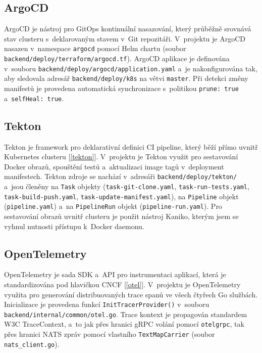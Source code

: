 \documentclass[11pt, a4paper, oneside]{article}
\begin{document}
\subsection{ArgoCD}

ArgoCD je nástroj pro GitOps kontinuální nasazování, který průběžně srovnává stav clusteru s~deklarovaným stavem v~Git repozitáři. V~projektu je ArgoCD nasazen v~namespace \texttt{argocd} pomocí Helm chartu (soubor \texttt{backend/deploy/terraform/argocd.tf}). ArgoCD aplikace je definována v~souboru \texttt{backend/deploy/argocd/application.yaml} a~je nakonfigurována tak, aby sledovala adresář \texttt{backend/deploy/k8s} na větvi \texttt{master}. Při detekci změny manifestů je provedena automatická synchronizace s~politikou \texttt{prune: true} a~\texttt{selfHeal: true}.

\subsection{Tekton}

Tekton je framework pro deklarativní definici CI pipeline, který běží přímo uvnitř Kubernetes clusteru [\ref{tekton}]. V~projektu je Tekton využit pro sestavování Docker obrazů, spouštění testů a~aktualizaci image tagů v~deployment manifestech. Tekton zdroje se nachází v~adresáři \texttt{backend/deploy/tekton/} a~jsou členěny na \texttt{Task} objekty (\texttt{task-git-clone.yaml}, \texttt{task-run-tests.yaml}, \texttt{task-build-push.yaml}, \texttt{task-update-manifest.yaml}), na \texttt{Pipeline} objekt (\texttt{pipeline.yaml}) a~na \texttt{PipelineRun} objekt (\texttt{pipeline-run.yaml}). Pro sestavování obrazů uvnitř clusteru je použit nástroj Kaniko, kterým jsem se vyhnul nutnosti přístupu k~Docker daemonu.

\subsection{OpenTelemetry}

OpenTelemetry je sada SDK a~API pro instrumentaci aplikací, která je standardizována pod hlavičkou CNCF [\ref{otel}]. V~projektu je OpenTelemetry využita pro generování distribuovaných trace spanů ve všech čtyřech Go službách. Inicializace je provedena funkcí \texttt{InitTracerProvider()} v~souboru \texttt{backend/internal/common/otel.go}. Trace kontext je propagován standardem W3C TraceContext, a~to jak přes hranici gRPC volání pomocí \texttt{otelgrpc}, tak přes hranici NATS zpráv pomocí vlastního \texttt{TextMapCarrier} (soubor \texttt{nats\_client.go}).
\end{document}

